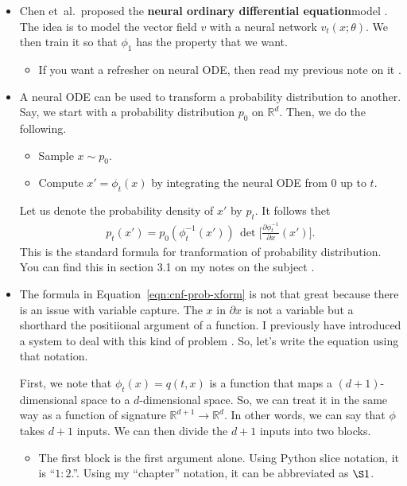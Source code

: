 \documentclass[10pt]{article}
\newcommand{\etal}{{et~al.}}
\newcommand{\ra}{\rightarrow}
\newcommand{\Real}{\mathbb{R}}
\begin{document}
\begin{itemize}
  \item Chen \etal\ proposed the {\bf neural ordinary differential equation}model \cite{Chen:2019}. The idea is to model the vector field $v$ with a neural network $v_t(x;\theta)$. We then train it so that $\phi_1$ has the property that we want.
  \begin{itemize}
    \item If you want a refresher on neural ODE, then read my previous note on it \cite{Khungurn:neuralODE}.
  \end{itemize}
  
  \item A neural ODE can be used to transform a probability distribution to another. Say, we start with a probability distribution $p_0$ on $\Real^d$. Then, we do the following.
  \begin{itemize}
    \item Sample $x \sim p_0$.
    \item Compute $x' = \phi_t(x)$ by integrating the neural ODE from 0 up to $t$.
  \end{itemize}
  Let us denote the probability density of $x'$ by $p_t$. It follows thet
  \begin{align}
    p_t(x') = p_0(\phi_t^{-1}(x'))\, \det \bigg[ \frac{\partial \phi_t^{-1}}{\partial x}(x') \bigg].\label{eqn:cnf-prob-xform}
  \end{align}
  This is the standard formula for tranformation of probability distribution. You can find this in section 3.1 on my notes on the subject \cite{Khungurn:ProbXform}.

  \item The formula in Equation~\eqref{eqn:cnf-prob-xform} is not that great because there is an issue with variable capture. The $x$ in $\partial x$ is not a variable but a shorthard the positiional argument of a function. I previously have introduced a system to deal with this kind of problem \cite{Khungurn:Notation}. So, let's write the equation using that notation.
  
  First, we note that $\phi_t(x) = q(t,x)$ is a function that maps a $(d+1)$-dimensional space to a $d$-dimensional space. So, we can treat it in the same way as a function of signature $\Real^{d+1} \ra \Real^d$. In other words, we can say that $\phi$ takes $d+1$ inputs. We can then divide the $d+1$ inputs into two blocks.
  \begin{itemize}
    \item The first block is the first argument alone. Using Python slice notation, it is ``$1:2$.''. Using my ``chapter'' notation, it can be abbreviated as $\S 1$.
    

\end{itemize}
\end{itemize}
\end{document}
